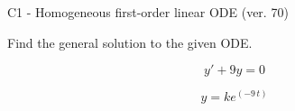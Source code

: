 \begin{exercise}
  \begin{exerciseTitle}C1 - Homogeneous first-order linear ODE (ver. 70)\end{exerciseTitle}
  \begin{exerciseStatement}
    
Find the general solution to the given ODE.

    
\[y'+9y=0\]

  \end{exerciseStatement}
  \begin{exerciseAnswer}
    
\[y= k e^{\left(-9 \, t\right)}\]

  \end{exerciseAnswer}
\end{exercise}